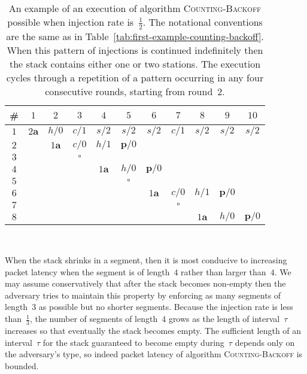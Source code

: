\documentclass[11pt]{article}
\newlength{\pagewidth}
\newcommand{\RB}{\raisebox{2.5ex}{~}}
\newcommand{\LB}{\raisebox{-1.5ex}{~}}
\begin{document}
\begin{table}[t]
\begin{center}
\begin{tabular}{| c ||c |c |c |c |c | c | c | c | c | c | }
\hline
\RB \LB
\# & $1$ & $2$ & $3$ &$4$&$5$& $6$ & $7$& $8$& $9$ & $10$ \\
\hline\hline
\RB \LB
$1$& $2\boldsymbol{a}$  & $h/0$ & $c/1$ & $s/2$& $s/2$&$s/2$& $c/1$& $s/2$& $s/2$ &$s/2$\\
\hline
\RB \LB
$2$ & & $1\boldsymbol{a}$ & $c/0$ &$h/1$& $\boldsymbol{p}/0$& & &&&\\
\hline
\RB \LB
$3$ & & & $\boldsymbol{\square}$  & & & &&& &\\
\hline
\RB \LB
$4$ & & &&  $1\boldsymbol{a}$ &$h/0$ &$\boldsymbol{p}/0$&&& &\\
\hline
\RB \LB
$5$ & & && & $\boldsymbol{\square}$ &&&& &\\
\hline
\RB \LB
$6$ & & &&  & &  $1\boldsymbol{a}$ &$c/0$&$h/1$& $\boldsymbol{p}/0$&\\
\hline
\RB \LB
$7$ & & &&  & &&$\boldsymbol{\square}$&& &\\
\hline
\RB \LB
$8$ & & &&  & &&& $1\boldsymbol{a}$ & $h/0$&$\boldsymbol{p}/0$\\
\hline
\end{tabular}
\parbox{\pagewidth}{
~
\caption{\label{tab:example-counting-backoff-stack-does-not-grow}
An example of an execution of algorithm \textsc{Counting-Backoff} possible when injection rate is~$\frac{1}{2}$.
The notational conventions are the same as in Table~\ref{tab:first-example-counting-backoff}.
When this pattern of injections is continued indefinitely then the stack contains either one or two stations.
The execution cycles through a repetition of a pattern occurring in any four consecutive rounds, starting from round~$2$.
}}
\end{center}
\end{table}


When the stack shrinks in a segment, then it is most conducive to increasing packet latency when the segment is of length~$4$ rather than larger than~$4$.
We may assume conservatively that after the stack becomes non-empty then the adversary tries to maintain this property by enforcing as many segments of length~$3$ as possible but no shorter segments.
Because the injection rate is less than~$\frac{1}{3}$, the number of segments of length~$4$ grows as the length of interval~$\tau$ increases so that eventually the stack becomes empty.
The sufficient length of an interval~$\tau$ for the stack guaranteed to become empty during~$\tau$  depends only on the adversary's type, so indeed packet latency of algorithm \textsc{Counting-Backoff} is bounded.
\end{document}
